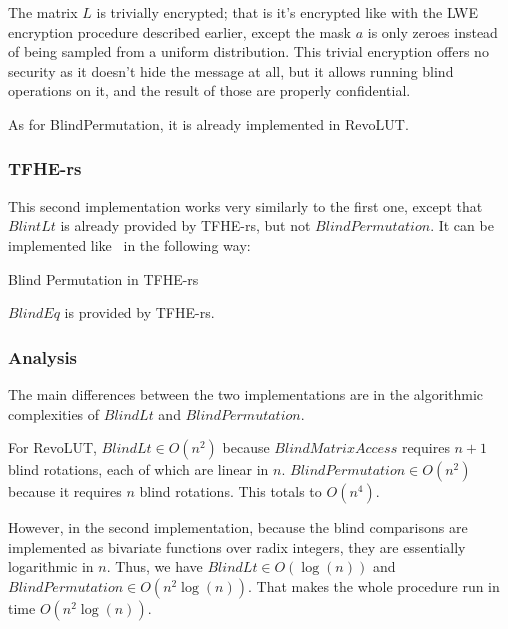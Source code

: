 \documentclass{article}
\begin{document}
The matrix $L$ is trivially encrypted; that is it's encrypted like with the LWE encryption procedure described earlier, except the mask $a$ is only zeroes instead of being sampled from a uniform distribution. This trivial encryption offers no security as it doesn't hide the message at all, but it allows running blind operations on it, and the result of those are properly confidential.

As for BlindPermutation, it is already implemented in RevoLUT.\@

\subsubsection*{TFHE-rs}

This second implementation works very similarly to the first one, except that $BlintLt$ is already provided by TFHE-rs, but not $BlindPermutation$. It can be implemented like~\cite{lauter_depth_2015} in the following way:

\begin{algorithm}
    \caption{Blind Permutation in TFHE-rs}\label{BlindPermutation}
    \begin{algorithmic}
                \EndFor{}
            \EndFor{}

        \EndFunction{}
    \end{algorithmic}
\end{algorithm}

$BlindEq$ is provided by TFHE-rs.

\subsubsection*{Analysis}

The main differences between the two implementations are in the algorithmic complexities of $BlindLt$ and $BlindPermutation$.

For RevoLUT, $BlindLt \in O(n^2)$ because $BlindMatrixAccess$ requires $n + 1$ blind rotations, each of which are linear in $n$. $BlindPermutation \in O(n^2)$ because it requires $n$ blind rotations. This totals to $O(n^4)$.

However, in the second implementation, because the blind comparisons are implemented as bivariate functions over radix integers, they are essentially logarithmic in $n$. Thus, we have $BlindLt \in O(\log(n))$ and $BlindPermutation \in O(n^2 \log(n))$. That makes the whole procedure run in time $O(n^2\log(n))$.
\end{document}
